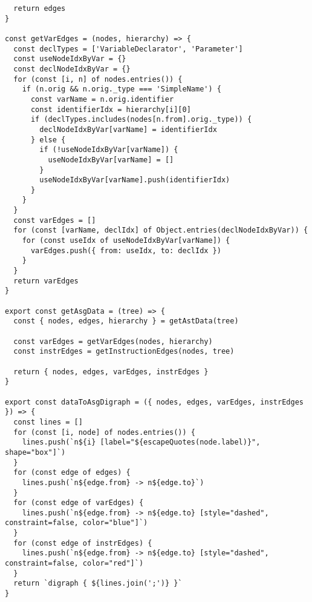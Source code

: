 \begin{lstlisting}
  return edges
}

const getVarEdges = (nodes, hierarchy) => {
  const declTypes = ['VariableDeclarator', 'Parameter']
  const useNodeIdxByVar = {}
  const declNodeIdxByVar = {}
  for (const [i, n] of nodes.entries()) {
    if (n.orig && n.orig._type === 'SimpleName') {
      const varName = n.orig.identifier
      const identifierIdx = hierarchy[i][0]
      if (declTypes.includes(nodes[n.from].orig._type)) {
        declNodeIdxByVar[varName] = identifierIdx
      } else {
        if (!useNodeIdxByVar[varName]) {
          useNodeIdxByVar[varName] = []
        }
        useNodeIdxByVar[varName].push(identifierIdx)
      }
    }
  }
  const varEdges = []
  for (const [varName, declIdx] of Object.entries(declNodeIdxByVar)) {
    for (const useIdx of useNodeIdxByVar[varName]) {
      varEdges.push({ from: useIdx, to: declIdx })
    }
  }
  return varEdges
}

export const getAsgData = (tree) => {
  const { nodes, edges, hierarchy } = getAstData(tree)

  const varEdges = getVarEdges(nodes, hierarchy)
  const instrEdges = getInstructionEdges(nodes, tree)

  return { nodes, edges, varEdges, instrEdges }
}

export const dataToAsgDigraph = ({ nodes, edges, varEdges, instrEdges }) => {
  const lines = []
  for (const [i, node] of nodes.entries()) {
    lines.push(`n${i} [label="${escapeQuotes(node.label)}", shape="box"]`)
  }
  for (const edge of edges) {
    lines.push(`n${edge.from} -> n${edge.to}`)
  }
  for (const edge of varEdges) {
    lines.push(`n${edge.from} -> n${edge.to} [style="dashed", constraint=false, color="blue"]`)
  }
  for (const edge of instrEdges) {
    lines.push(`n${edge.from} -> n${edge.to} [style="dashed", constraint=false, color="red"]`)
  }
  return `digraph { ${lines.join(';')} }`
}
\end{lstlisting}
